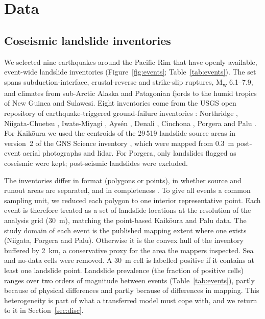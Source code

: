 \section{Data}\label{sec:data}

\subsection{Coseismic landslide inventories}
We selected nine earthquakes around the Pacific Rim that have openly available, event-wide landslide inventories (Figure~\ref{fig:events}; Table~\ref{tab:events}). The set spans subduction-interface, crustal-reverse and strike-slip ruptures, M\textsubscript{w} 6.1--7.9, and climates from sub-Arctic Alaska and Patagonian fjords to the humid tropics of New Guinea and Sulawesi. Eight inventories come from the USGS open repository of earthquake-triggered ground-failure inventories \citep{schmitt2017}: Northridge \citep{harp1996,data_harp}, Niigata-Chuetsu \citep{data_niigata}, Iwate-Miyagi \citep{yagi2009,data_iwate}, Ays\'en \citep{data_aisen}, Denali \citep{gorum2014denali,data_denali}, Cinchona \citep{data_cinchona}, Porgera \citep{tanyas2022png,data_porgera} and Palu \citep{zhao2021palu,data_palu}. For Kaik\={o}ura we used the centroids of the 29\,519 landslide source areas in version~2 of the GNS Science inventory \citep{massey2020update,data_kaikoura}, which were mapped from 0.3~m post-event aerial photographs and lidar. For Porgera, only landslides flagged as coseismic were kept; post-seismic landslides were excluded.

The inventories differ in format (polygons or points), in whether source and runout areas are separated, and in completeness \citep{tanyas2017}. To give all events a common sampling unit, we reduced each polygon to one interior representative point. Each event is therefore treated as a set of landslide locations at the resolution of the analysis grid (30~m), matching the point-based Kaik\={o}ura and Palu data. The study domain of each event is the published mapping extent where one exists (Niigata, Porgera and Palu). Otherwise it is the convex hull of the inventory buffered by 2~km, a conservative proxy for the area the mappers inspected. Sea and no-data cells were removed. A 30~m cell is labelled positive if it contains at least one landslide point. Landslide prevalence (the fraction of positive cells) ranges over two orders of magnitude between events (Table~\ref{tab:events}), partly because of physical differences and partly because of differences in mapping. This heterogeneity is part of what a transferred model must cope with, and we return to it in Section~\ref{sec:disc}.

